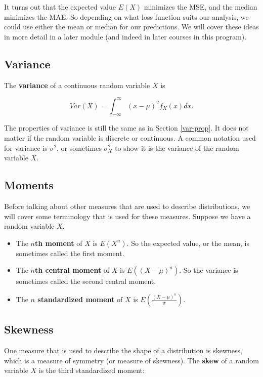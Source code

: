 \documentclass[
]{book}
\providecommand{\tightlist}{%
  \setlength{\itemsep}{0pt}\setlength{\parskip}{0pt}}
\begin{document}
It turns out that the expected value \(E(X)\) minimizes the MSE, and the median minimizes the MAE. So depending on what loss function suits our analysis, we could use either the mean or median for our predictions. We will cover these ideas in more detail in a later module (and indeed in later courses in this program).

\subsection{Variance}\label{variance-1}

The \textbf{variance} of a continuous random variable \(X\) is

\begin{equation} 
Var(X) = \int_{-\infty}^{\infty} (x-\mu)^2 f_X(x) dx.
\label{eq:4-var}
\end{equation}

The properties of variance is still the same as in Section \ref{var-prop}. It does not matter if the random variable is discrete or continuous. A common notation used for variance is \(\sigma^2\), or sometimes \(\sigma_X^2\) to show it is the variance of the random variable \(X\).

\subsection{Moments}\label{moments}

Before talking about other measures that are used to describe distributions, we will cover some terminology that is used for these measures. Suppose we have a random variable \(X\).

\begin{itemize}
\tightlist
\item
  The \textbf{\(n\)th moment} of \(X\) is \(E(X^n)\). So the expected value, or the mean, is sometimes called the first moment.
\item
  The \textbf{\(n\)th central moment} of \(X\) is \(E((X-\mu)^n)\). So the variance is sometimes called the second central moment.
\item
  The \textbf{\(n\) standardized moment} of \(X\) is \(E(\frac{(X-\mu)^n}{\sigma})\).
\end{itemize}

\subsection{Skewness}\label{skewness}

One measure that is used to describe the shape of a distribution is skewness, which is a measure of symmetry (or measure of skewness). The \textbf{skew} of a random variable \(X\) is the third standardized moment:
\end{document}
